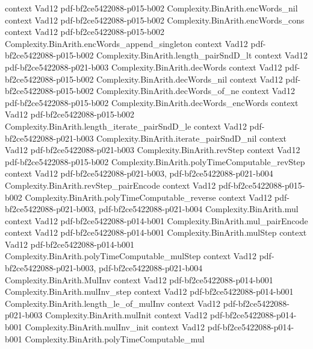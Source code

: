 \begin{theorem}
  {context}
  {Vad12}
  {pdf-bf2ce5422088-p015-b002}
\proofstep
  {Complexity.BinArith.encWords_nil}
  {context}
  {Vad12}
  {pdf-bf2ce5422088-p015-b002}
\proofstep
  {Complexity.BinArith.encWords_cons}
  {context}
  {Vad12}
  {pdf-bf2ce5422088-p015-b002}
\proofstep
  {Complexity.BinArith.encWords_append_singleton}
  {context}
  {Vad12}
  {pdf-bf2ce5422088-p015-b002}
\proofstep
  {Complexity.BinArith.length_pairSndD_lt}
  {context}
  {Vad12}
  {pdf-bf2ce5422088-p021-b003}
\proofstep
  {Complexity.BinArith.decWords}
  {context}
  {Vad12}
  {pdf-bf2ce5422088-p015-b002}
\proofstep
  {Complexity.BinArith.decWords_nil}
  {context}
  {Vad12}
  {pdf-bf2ce5422088-p015-b002}
\proofstep
  {Complexity.BinArith.decWords_of_ne}
  {context}
  {Vad12}
  {pdf-bf2ce5422088-p015-b002}
\proofstep
  {Complexity.BinArith.decWords_encWords}
  {context}
  {Vad12}
  {pdf-bf2ce5422088-p015-b002}
\proofstep
  {Complexity.BinArith.length_iterate_pairSndD_le}
  {context}
  {Vad12}
  {pdf-bf2ce5422088-p021-b003}
\proofstep
  {Complexity.BinArith.iterate_pairSndD_nil}
  {context}
  {Vad12}
  {pdf-bf2ce5422088-p021-b003}
\proofstep
  {Complexity.BinArith.revStep}
  {context}
  {Vad12}
  {pdf-bf2ce5422088-p015-b002}
\proofstep
  {Complexity.BinArith.polyTimeComputable_revStep}
  {context}
  {Vad12}
  {pdf-bf2ce5422088-p021-b003,
    pdf-bf2ce5422088-p021-b004}
\proofstep
  {Complexity.BinArith.revStep_pairEncode}
  {context}
  {Vad12}
  {pdf-bf2ce5422088-p015-b002}
\proofstep
  {Complexity.BinArith.polyTimeComputable_reverse}
  {context}
  {Vad12}
  {pdf-bf2ce5422088-p021-b003,
    pdf-bf2ce5422088-p021-b004}
\proofstep
  {Complexity.BinArith.mul}
  {context}
  {Vad12}
  {pdf-bf2ce5422088-p014-b001}
\proofstep
  {Complexity.BinArith.mul_pairEncode}
  {context}
  {Vad12}
  {pdf-bf2ce5422088-p014-b001}
\proofstep
  {Complexity.BinArith.mulStep}
  {context}
  {Vad12}
  {pdf-bf2ce5422088-p014-b001}
\proofstep
  {Complexity.BinArith.polyTimeComputable_mulStep}
  {context}
  {Vad12}
  {pdf-bf2ce5422088-p021-b003,
    pdf-bf2ce5422088-p021-b004}
\proofstep
  {Complexity.BinArith.MulInv}
  {context}
  {Vad12}
  {pdf-bf2ce5422088-p014-b001}
\proofstep
  {Complexity.BinArith.mulInv_step}
  {context}
  {Vad12}
  {pdf-bf2ce5422088-p014-b001}
\proofstep
  {Complexity.BinArith.length_le_of_mulInv}
  {context}
  {Vad12}
  {pdf-bf2ce5422088-p021-b003}
\proofstep
  {Complexity.BinArith.mulInit}
  {context}
  {Vad12}
  {pdf-bf2ce5422088-p014-b001}
\proofstep
  {Complexity.BinArith.mulInv_init}
  {context}
  {Vad12}
  {pdf-bf2ce5422088-p014-b001}
\proofstep
  {Complexity.BinArith.polyTimeComputable_mul}

\end{theorem}
